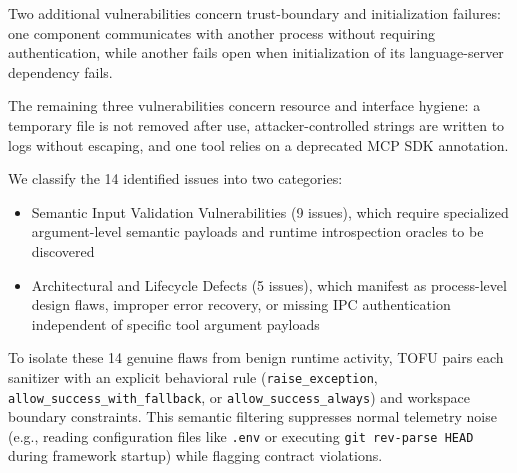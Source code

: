Two additional vulnerabilities concern trust-boundary and initialization
failures: one component communicates with another process without requiring
authentication, while another fails open when initialization of its
language-server dependency fails.

The remaining three vulnerabilities concern resource and interface
hygiene: a temporary file is not removed after use, attacker-controlled
strings are written to logs without escaping, and one tool relies on a
deprecated MCP SDK annotation.


We classify the 14 identified issues into two categories: 
\begin{itemize}
    \item Semantic Input Validation Vulnerabilities (9 issues), which require specialized argument-level semantic payloads and runtime introspection oracles to be discovered
    \item Architectural and Lifecycle Defects (5 issues), which manifest as process-level design flaws, improper error recovery, or missing IPC authentication independent of specific tool argument payloads
\end{itemize} 



To isolate these 14 genuine flaws from benign runtime activity, TOFU pairs each sanitizer with an explicit behavioral rule (\texttt{raise\_exception}, \texttt{allow\_success\_with\_fallback}, or \texttt{allow\_success\_always}) and workspace boundary constraints. This semantic filtering suppresses normal telemetry noise (e.g., reading configuration files like \texttt{.env} or executing \texttt{git rev-parse HEAD} during framework startup) while flagging contract violations.

